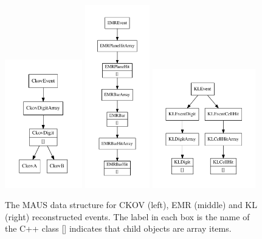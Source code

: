 \documentclass[11pt]{article}
\begin{document}
\begin{figure}[ptb]
\centering
\includegraphics[width=0.3\textwidth]{figs/ckov_datastructure.pdf}
\includegraphics[width=0.25\textwidth]{figs/emr_datastructure.pdf}
\includegraphics[width=0.4\textwidth]{figs/kl_datastructure.pdf}
\caption{The MAUS data structure for CKOV (left), EMR (middle) and KL (right) reconstructed events. The label in each box is the name of the C++ class [] indicates that child objects are array items.}
\label{fig:datastructure-recon-ckov-emr-kl}
\end{figure}
\end{document}
